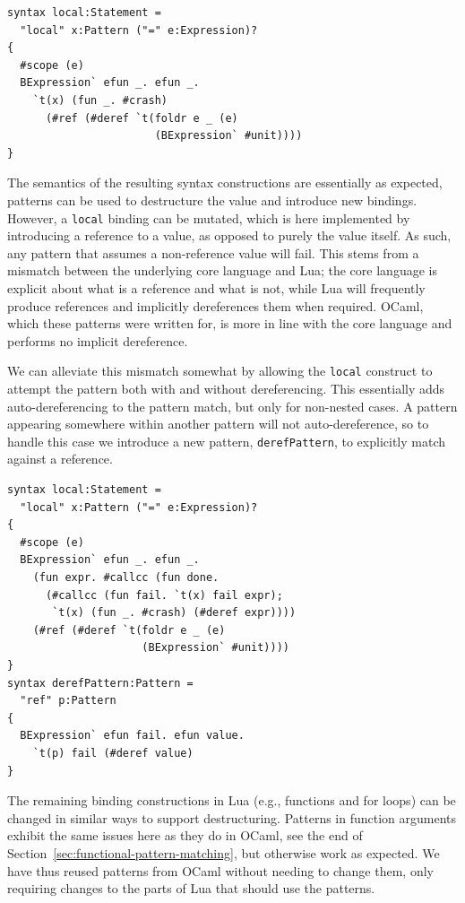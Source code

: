 \documentclass{kththesis}
\begin{document}
\begin{verbatim}
syntax local:Statement =
  "local" x:Pattern ("=" e:Expression)?
{
  #scope (e)
  BExpression` efun _. efun _.
    `t(x) (fun _. #crash)
      (#ref (#deref `t(foldr e _ (e)
                       (BExpression` #unit))))
}
\end{verbatim}

The semantics of the resulting syntax constructions are essentially as expected, patterns can be used to destructure the value and introduce new bindings. However, a \texttt{local} binding can be mutated, which is here implemented by introducing a reference to a value, as opposed to purely the value itself. As such, any pattern that assumes a non-reference value will fail. This stems from a mismatch between the underlying core language and Lua; the core language is explicit about what is a reference and what is not, while Lua will frequently produce references and implicitly dereferences them when required. OCaml, which these patterns were written for, is more in line with the core language and performs no implicit dereference.

We can alleviate this mismatch somewhat by allowing the \texttt{local} construct to attempt the pattern both with and without dereferencing. This essentially adds auto-dereferencing to the pattern match, but only for non-nested cases. A pattern appearing somewhere within another pattern will not auto-dereference, so to handle this case we introduce a new pattern, \texttt{derefPattern}, to explicitly match against a reference.

\begin{verbatim}
syntax local:Statement =
  "local" x:Pattern ("=" e:Expression)?
{
  #scope (e)
  BExpression` efun _. efun _.
    (fun expr. #callcc (fun done.
      (#callcc (fun fail. `t(x) fail expr);
       `t(x) (fun _. #crash) (#deref expr))))
    (#ref (#deref `t(foldr e _ (e)
                     (BExpression` #unit))))
}
syntax derefPattern:Pattern =
  "ref" p:Pattern
{
  BExpression` efun fail. efun value.
    `t(p) fail (#deref value)
}
\end{verbatim}

The remaining binding constructions in Lua (e.g., functions and for loops) can be changed in similar ways to support destructuring. Patterns in function arguments exhibit the same issues here as they do in OCaml, see the end of Section~\ref{sec:functional-pattern-matching}, but otherwise work as expected. We have thus reused patterns from OCaml without needing to change them, only requiring changes to the parts of Lua that should use the patterns.
\end{document}
